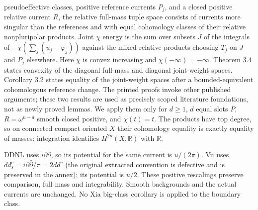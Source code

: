 \documentclass[
  11pt,
]{article}
\begin{document}
\begin{itemize}
  pseudoeffective classes, positive reference currents \(P_j\), and a
  closed positive relative current \(R\), the relative full-mass tuple
  space consists of currents more singular than the references and with
  equal cohomology classes of their relative nonpluripolar products.
  Joint \(\chi\) energy is the sum over subsets \(J\) of the integrals
  of \(-\chi(\sum_j(u_j-\varphi_j))\) against the mixed relative
  products choosing \(T_j\) on \(J\) and \(P_j\) elsewhere. Here
  \(\chi\) is convex increasing and \(\chi(-\infty)=-\infty\). Theorem
  3.4 states convexity of the diagonal full-mass and diagonal
  joint-weight spaces. Corollary 3.2 states equality of the joint-weight
  spaces after a bounded-equivalent cohomologous reference change. The
  printed proofs invoke other published arguments; these two results are
  used as precisely scoped literature foundations, not as newly proved
  lemmas. We apply them only for \(d\geq1\), \(d\) equal slots \(P\),
  \(R=\omega^{n-d}\) smooth closed positive, and \(\chi(t)=t\). The
  products have top degree, so on connected compact oriented \(X\) their
  cohomology equality is exactly equality of masses: integration
  identifies \(H^{2n}(X,\mathbb{R})\) with \(\mathbb{R}\).
\end{itemize}

DDNL uses \(i\partial\bar\partial\), so its potential for the same
current is \(u/(2\pi)\). Vu uses
\(dd^c_s=i\partial\bar\partial/\pi=2dd^c\) (the original extracted
convention is defective and is preserved in the annex); its potential is
\(u/2\). These positive rescalings preserve comparison, full mass and
integrability. Smooth backgrounds and the actual currents are unchanged.
No Xia big-class corollary is applied to the boundary class.
\end{document}
